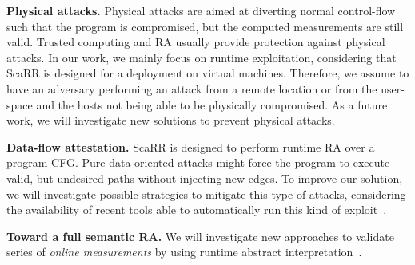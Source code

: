 \textbf{Physical attacks.}
Physical attacks are aimed at diverting normal control-flow such that the 
program is compromised, but the computed measurements are still valid. Trusted 
computing and RA usually provide protection against physical attacks. In our 
work, we mainly focus on runtime exploitation, considering that ScaRR is 
designed for a deployment on virtual machines. Therefore, we assume to have an 
adversary performing an attack from a remote location or from the user-space 
and the hosts not being able to be physically compromised. As a future work, we 
will investigate new solutions to prevent physical attacks.

\textbf{Data-flow attestation.}
ScaRR is designed to perform runtime RA over a program CFG. Pure data-oriented 
attacks might force the program to execute valid, but undesired paths without 
injecting new edges. To improve our solution, we will investigate possible 
strategies to mitigate this type of attacks, considering the availability of 
recent tools able to automatically run this kind of exploit~\cite{hu2016data}. 

\textbf{Toward a full semantic RA.}
We will investigate new approaches to validate series of \emph{online 
measurements} by using runtime abstract 
interpretation~\cite{Ge:2017:GGC:3037697.3037716,Hu:2018:EUC:3243734.3243797,Liu:2018:RED:3243734.3243826}.
